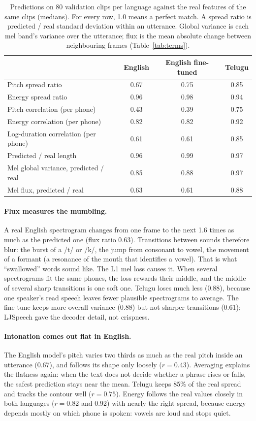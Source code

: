 \documentclass[11pt,a4paper]{article}
\begin{document}
\begin{table}[H]\centering\small
\caption{Predictions on 80 validation clips per language against the real features of the same clips (medians).
For every row, 1.0 means a perfect match. A spread ratio is predicted / real standard deviation within an
utterance. Global variance is each mel band's variance over the utterance; flux is the mean absolute change between
neighbouring frames (Table~\ref{tab:terms}).}
\label{tab:var}
\begin{tabular}{@{}lccc@{}}
\toprule
 & English & English fine-tuned & Telugu \\
\midrule
Pitch spread ratio & 0.67 & 0.75 & 0.85 \\
Energy spread ratio & 0.96 & 0.98 & 0.94 \\
Pitch correlation (per phone) & 0.43 & 0.39 & 0.75 \\
Energy correlation (per phone) & 0.82 & 0.82 & 0.92 \\
Log-duration correlation (per phone) & 0.61 & 0.61 & 0.85 \\
Predicted / real length & 0.96 & 0.99 & 0.97 \\
Mel global variance, predicted / real & 0.85 & 0.88 & 0.97 \\
Mel flux, predicted / real & 0.63 & 0.61 & 0.88 \\
\bottomrule
\end{tabular}
\end{table}

\paragraph{Flux measures the mumbling.} A real English spectrogram changes from one frame to the next 1.6 times as
much as the predicted one (flux ratio 0.63). Transitions between sounds therefore blur: the burst of a /t/ or /k/, the jump
from consonant to vowel, the movement of a formant (a resonance of the mouth that identifies a vowel). That is what ``swallowed'' words sound like. The L1 mel loss
causes it. When several spectrograms fit the same phones, the loss rewards their middle, and the middle of several
sharp transitions is one soft one. Telugu loses much less (0.88), because one speaker's read speech leaves fewer
plausible spectrograms to average. The fine-tune keeps more overall variance (0.88) but not sharper transitions
(0.61); LJSpeech gave the decoder detail, not crispness.

\paragraph{Intonation comes out flat in English.} The English model's pitch varies two thirds as much as the real
pitch inside an utterance (0.67), and follows its shape only loosely ($r = 0.43$). Averaging explains the
flatness again: when the text does not decide whether a phrase rises or falls, the safest prediction stays near the
mean. Telugu keeps 85\% of the real spread and tracks the contour well ($r = 0.75$). Energy follows the real values
closely in both languages ($r = 0.82$ and 0.92) with nearly the right spread, because energy depends mostly on
which phone is spoken: vowels are loud and stops quiet.
\end{document}
